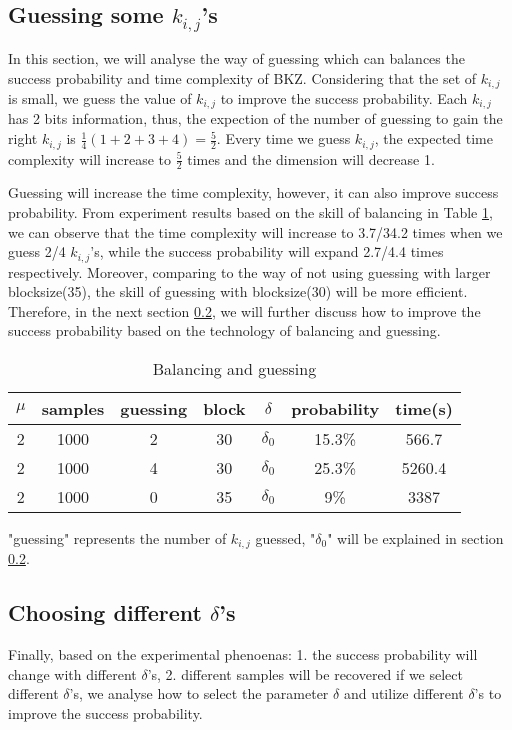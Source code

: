 \documentclass[sigconf]{acmart}
\begin{document}
\subsection{Guessing some $k_{i,j}$’s}\label{section3.3}
In this section, we will analyse the way of guessing which can balances the success probability and time complexity of BKZ.
Considering that the set of $k_{i,j}$ is small, we guess the value of $k_{i,j}$ to improve the success probability. Each $k_{i,j}$ has 2 bits information, thus, the expection of the number of guessing to gain the right $k_{i,j}$ is $\frac{1}{4}(1+2+3+4)=\frac{5}{2}$. Every time we guess $k_{i,j}$, the expected time complexity will increase to $\frac{5}{2}$ times and the dimension will decrease 1.

Guessing will increase the time complexity, however, it can also improve success probability. From experiment results based on the skill of balancing in Table \ref{table2}, we can observe that the time complexity will increase to 3.7/34.2 times when we guess 2/4 $k_{i,j}$'s, while the success probability will expand 2.7/4.4 times respectively.
Moreover, comparing to the way of not using guessing with larger blocksize(35), the skill of guessing with blocksize(30) will be more efficient. Therefore, in the next section \ref{3.4}, we will further discuss how to improve the success probability based on the technology of balancing and guessing.

\begin{table}[!hbp]
\begin{tabular}{|c|c|c|c|c|c|c|}
\hline
$\mu$&samples&guessing&block&$\delta$&probability&time(s)\\
\hline
2&1000&2&30&$\delta_0$&15.3\%&566.7\\
\hline
2&1000&4&30&$\delta_0$&25.3\%&5260.4\\
\hline
2&1000&0&35&$\delta_0$&9\%&3387\\
\hline
\end{tabular}
\caption{Balancing and guessing}\label{table2}
"guessing" represents the number of $k_{i,j}$ guessed, "$\delta_0$" will be explained in section \ref{3.4}.
\end{table}


\subsection{Choosing different $\delta$’s}\label{3.4}
Finally, based on the experimental phenoenas: 1. the success probability will change with different $\delta$'s, 2. different samples  will be recovered if we select different $\delta$'s, we  analyse how to select the parameter $\delta$ and utilize different $\delta$'s to improve the success probability.
\end{document}
